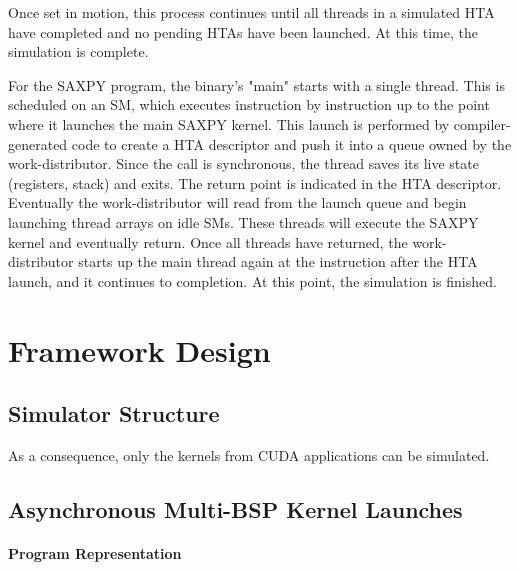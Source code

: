\documentclass[conference, 10pt]{IEEEtran}
\begin{document}
Once set in motion, this process continues until all threads in a simulated HTA
have completed and no pending HTAs have been launched.  At this time, the
simulation is complete.

For the SAXPY program, the binary's "main" starts with a single thread.  This is
scheduled on an SM, which executes instruction by instruction up to the point
where it launches the main SAXPY kernel.  This launch is performed by
compiler-generated code to create a HTA descriptor and push it into a queue
owned by the work-distributor.  Since the call is synchronous, the thread
saves its live state (registers, stack) and exits.  The return point is
indicated in the HTA descriptor.  Eventually the work-distributor will read from
the launch queue and begin launching thread arrays on idle SMs.  These threads
will execute the SAXPY kernel and eventually return.  Once all threads have 
returned, the work-distributor starts up the main thread again at the
instruction after the HTA launch, and it continues to completion.  At this
point, the simulation is finished.  






\section{Framework Design}
\label{sec:framework-design}

\subsection{Simulator Structure}

As a consequence, only the kernels from CUDA applications can be simulated.  

\subsection{Asynchronous Multi-BSP Kernel Launches}

\paragraph{Program Representation}
\end{document}

